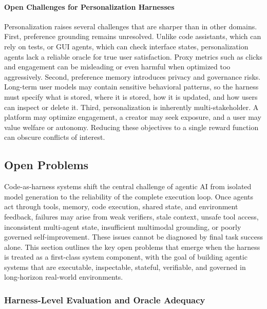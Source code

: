 \paragraph{Open Challenges for Personalization Harnesses}
Personalization raises several challenges that are sharper than in other domains. First, preference grounding remains unresolved. Unlike code assistants, which can rely on tests, or GUI agents, which can check interface states, personalization agents lack a reliable oracle for true user satisfaction. Proxy metrics such as clicks and engagement can be misleading or even harmful when optimized too aggressively.
Second, preference memory introduces privacy and governance risks. Long-term user models may contain sensitive behavioral patterns, so the harness must specify what is stored, where it is stored, how it is updated, and how users can inspect or delete it. Third, personalization is inherently multi-stakeholder. A platform may optimize engagement, a creator may seek exposure, and a user may value welfare or autonomy. Reducing these objectives to a single reward function can obscure conflicts of interest.



\subsection{Open Problems}

Code-as-harness systems shift the central challenge of agentic AI from isolated model generation to the reliability of the complete execution loop. Once agents act through tools, memory, code execution, shared state, and environment feedback, failures may arise from weak verifiers, stale context, unsafe tool access, inconsistent multi-agent state, insufficient multimodal grounding, or poorly governed self-improvement. These issues cannot be diagnosed by final task success alone. This section outlines the key open problems that emerge when the harness is treated as a first-class system component, with the goal of building agentic systems that are executable, inspectable, stateful, verifiable, and governed in long-horizon real-world environments.

\subsubsection{Harness-Level Evaluation and Oracle Adequacy}

